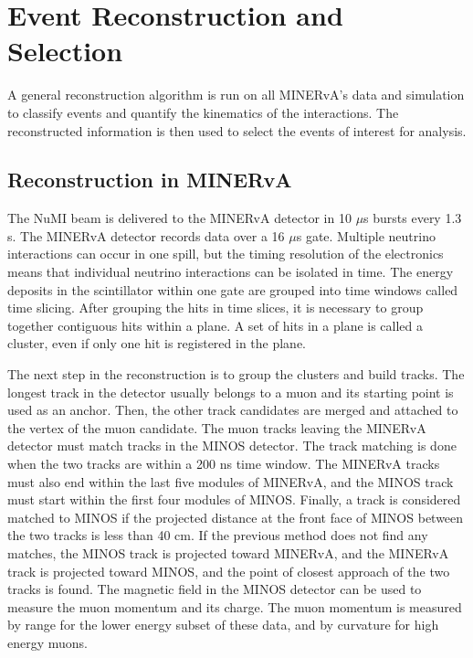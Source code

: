 \documentclass[aps, prd, twocolumn, showpacs, superscriptaddress, floatfix]{revtex4-2}
\begin{document}
\section{Event Reconstruction and Selection}
A general reconstruction algorithm is run on all MINERvA's data and simulation to classify events and quantify the kinematics of the interactions. The reconstructed information is then used to select the events of interest for analysis.

\subsection{Reconstruction in MINERvA}
The NuMI beam is delivered to the MINERvA detector in 10 $\mu$s bursts every 1.3 s. The MINERvA detector records data over a 16 $\mu$s gate. Multiple neutrino interactions can occur in one spill, but the timing resolution of the electronics means that individual neutrino interactions can be isolated in time. The energy deposits in the scintillator within one gate are grouped into time windows called time slicing. After grouping the hits in time slices, it is necessary to group together contiguous hits within a plane. A set of hits in a plane is called a cluster, even if only one hit is registered in the plane.

The next step in the reconstruction is to group the clusters and build tracks. The longest track in the detector usually belongs to a muon and its starting point is used as an anchor. Then, the other track candidates are merged and attached to the vertex of the muon candidate. The muon tracks leaving the MINERvA detector must match tracks in the MINOS detector. The track matching is done when the two tracks are within a 200 ns time window. The MINERvA tracks must also end within the last five modules of MINERvA, and the MINOS track must start within the first four modules of MINOS. Finally, a track is considered matched to MINOS if the projected distance at the front face of MINOS between the two tracks is less than 40 cm. If the previous method does not find any matches, the MINOS track is projected toward MINERvA, and the MINERvA track is projected toward MINOS, and the point of closest approach of the two tracks is found. The magnetic field in the MINOS detector can be used to measure the muon momentum and its charge. The muon momentum is measured by range for the lower energy subset of these data, and by curvature for high energy muons.
\end{document}
